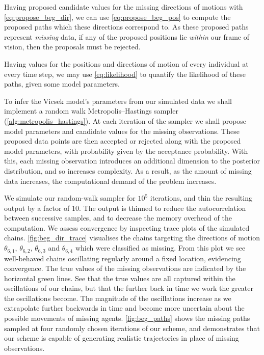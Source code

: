 Having proposed candidate values for the missing directions of motions with
\cref{eq:propose_beg_dir}, we can use \cref{eq:propose_beg_pos} to compute the
proposed paths which these directions correspond to. As these proposed
paths represent \emph{missing} data, if any of the proposed positions lie
\emph{within} our frame of vision, then the proposals must be rejected.

Having values for the positions and directions of motion of every individual at
every time step, we may use \cref{eq:likelihood} to quantify the likelihood of
these paths, given some model parameters.

To infer the Vicsek model's parameters from our simulated data we shall
implement a random walk Metropolis--Hastings sampler
(\cref{alg:metropolis_hastings}). At each iteration of the sampler we shall
propose model parameters and candidate values for the missing observations.
These proposed data points are then accepted or rejected along with the
proposed model parameters, with probability given by the acceptance
probability. With this, each missing observation introduces an additional
dimension to the posterior distribution, and so increases complexity. As a
result, as the amount of missing data increases, the computational demand
of the problem increases.

We simulate our random-walk sampler for $10^5$ iterations, and thin the
resulting output by a factor of $10$. The output is thinned to reduce the
autocorrelation between successive samples, and to decrease the memory overhead
of the computation. We assess convergence by inspecting trace plots of the
simulated chains. \cref{fig:beg_dir_trace} visualises the chains targeting the
directions of motion $\theta_{6,1}$, $\theta_{6,2}$, $\theta_{6,3}$ and
$\theta_{6,4}$ which were classified as missing. From this plot we see
well-behaved chains oscillating regularly around a fixed location, evidencing
convergence. The true values of the missing observations are indicated by the
horizontal green lines. See that the true values are all captured within the
oscillations of our chains, but that the further back in time we work the
greater the oscillations become. The magnitude of the oscillations increase as
we extrapolate further backwards in time and become more uncertain about the
possible movements of missing agents. \cref{fig:beg_paths} shows the missing
paths sampled at four randomly chosen iterations of our scheme, and
demonstrates that our scheme is capable of generating realistic trajectories in
place of missing observations.

